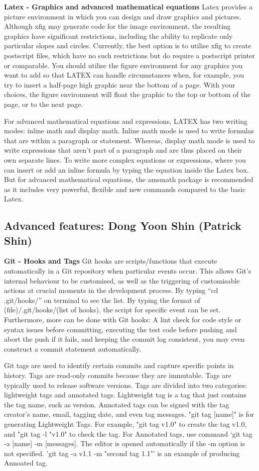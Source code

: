 \documentclass[a4paper, 11pt]{report}
\begin{document}
\textbf{Latex - Graphics and advanced mathematical equations}
Latex provides a picture environment in which you can design and draw graphics and pictures. Although xfig may generate code for the image environment, the resulting graphics have significant restrictions, including the ability to replicate only particular slopes and circles. Currently, the best option is to utilise xfig to create postscript files, which have no such restrictions but do require a postscript printer or comparable. You should utilise the figure environment for any graphics you want to add so that LATEX can handle circumstances when, for example, you try to insert a half-page high graphic near the bottom of a page. With your choices, the figure environment will float the graphic to the top or bottom of the page, or to the next page.

For advanced mathematical equations and expressions, LATEX has two writing modes: inline math and display math. Inline math mode is used to write formulas that are within a paragraph or statement. Whereas, display math mode is used to write expressions that aren't part of a paragraph and are thus placed on their own separate lines. To write more complex equations or expressions, where you can insert or add an inline formula by typing the equation inside the Latex box. But for advanced mathematical equations, the amsmath package is recommended as it includes very powerful, flexible and new commands compared to the basic Latex.


\subsection{Advanced features: Dong Yoon Shin (Patrick Shin)}
\textbf{Git - Hooks and Tags}
Git hooks are scripts/functions that execute automatically in a Git repository when particular events occur. This allows Git's internal behaviour to be customised, as well as the triggering of customisable actions at crucial moments in the development process. By typing “cd .git/hooks/” on terminal to see the list. By typing the format of (file)/.git/hooks/(list of hooks), the script for specific event can be set. Furthermore, more can be done with Git hooks: A lint check for code style or syntax issues before committing, executing the test code before pushing and abort the push if it fails, and keeping the commit log consistent, you may even construct a commit statement automatically.

Git tags are used to identify certain commits and capture specific points in history. Tags are read-only commits because they are immutable. Tags are typically used to release software versions. Tags are divided into two categories: lightweight tags and annotated tags. Lightweight tag is a tag that just contains the tag name, such as version. Annotated tags can be signed with the tag creator's name, email, tagging date, and even tag messages.
"git tag [name]" is for generating Lightweight Tags. For example, "git tag v1.0" to create the tag v1.0, and "git tag -l "v1.0" to check the tag. For Annotated tags, use command ‘git tag -a [name] -m [messages]. The editor is opened automatically if the -m option is not specified. 'git tag -a v1.1 -m "second tag 1.1"' is an example of producing Annoated tag.
\end{document}
